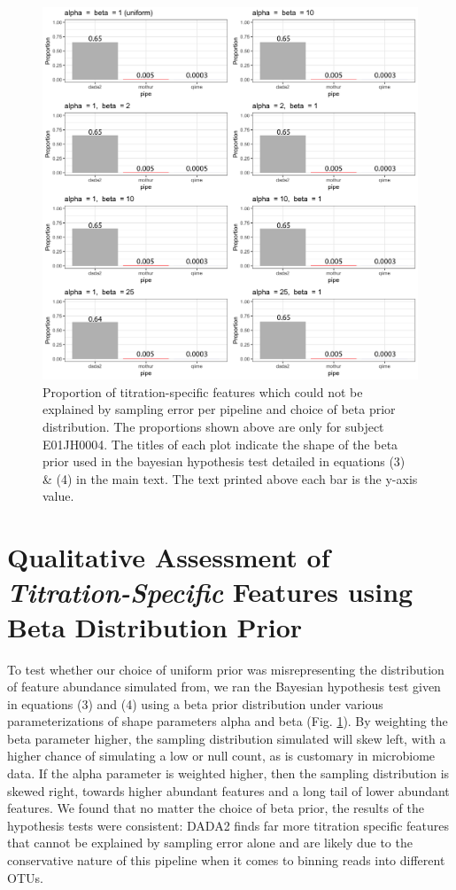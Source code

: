 \documentclass[12pt]{article}
\begin{document}
\clearpage

\begin{figure}
\centering
\includegraphics[width=0.9\linewidth]{beta_bayes_barplots_withprops.png}
\caption{\label{fig:bayesPrior} Proportion of titration-specific features which could not be explained by sampling error per pipeline and choice of beta prior distribution. The proportions shown above are only for subject E01JH0004. The titles of each plot indicate the shape of the beta prior used in the bayesian hypothesis test detailed in equations (3) \& (4) in the main text. The text printed above each bar is the y-axis value. }
\end{figure}

\section*{Qualitative Assessment of \emph{Titration-Specific} Features using Beta Distribution Prior}
To test whether our choice of uniform prior was misrepresenting the distribution of feature abundance simulated from, we ran the Bayesian hypothesis test given in equations (3) and (4) using a beta prior distribution under various parameterizations of shape parameters alpha and beta (Fig. \ref{fig:bayesPrior}). By weighting the beta parameter higher, the sampling distribution simulated will skew left, with a higher chance of simulating a low or null count, as is customary in microbiome data. If the alpha parameter is weighted higher, then the sampling distribution is skewed right, towards higher abundant features and a long tail of lower abundant features. We found that no matter the choice of beta prior, the results of the hypothesis tests were consistent: DADA2 finds far more titration specific features that cannot be explained by sampling error alone and are likely due to the conservative nature of this pipeline when it comes to binning reads into different OTUs.
\end{document}
